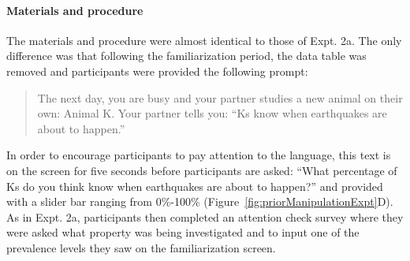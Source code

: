 \documentclass[floatsintext,doc]{apa6}
\let\oldparagraph\paragraph
\renewcommand{\paragraph}[1]{\oldparagraph{#1}\mbox{}}
\begin{document}
\hypertarget{materials-and-procedure}{%
\paragraph{Materials and procedure}\label{materials-and-procedure}}
%
The materials and procedure were almost identical to those of Expt. 2a.
The only difference was that following the familiarization period, the data table was removed and participants were provided the following prompt:

\begin{quote}
The next day, you are busy and your partner studies a new animal on their own: Animal K.
Your partner tells you: \enquote{Ks know when earthquakes are about to happen.}
\end{quote}

In order to encourage participants to pay attention to the language, this text is on the screen for five seconds before participants are asked: \enquote{What percentage of Ks do you think know when earthquakes are about to happen?} and provided with a slider bar ranging from 0\%-100\% (Figure~\ref{fig:priorManipulationExpt}D).
As in Expt. 2a, participants then completed an attention check survey where they were asked what property was being investigated and to input one of the prevalence levels they saw on the familiarization screen.

\end{document}
